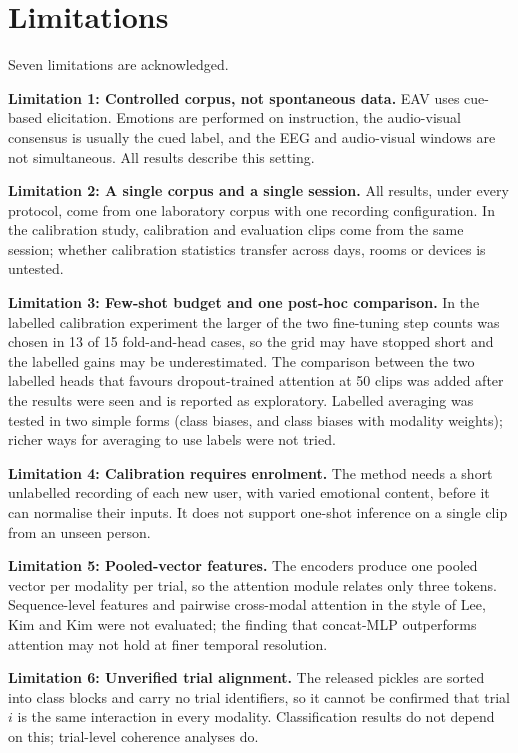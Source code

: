 \section{Limitations}
Seven limitations are acknowledged.

\textbf{Limitation 1: Controlled corpus, not spontaneous data.} EAV uses cue-based elicitation. Emotions are performed on instruction, the audio-visual consensus is usually the cued label, and the EEG and audio-visual windows are not simultaneous. All results describe this setting.

\textbf{Limitation 2: A single corpus and a single session.} All results, under every protocol, come from one laboratory corpus with one recording configuration. In the calibration study, calibration and evaluation clips come from the same session; whether calibration statistics transfer across days, rooms or devices is untested.

\textbf{Limitation 3: Few-shot budget and one post-hoc comparison.} In the labelled calibration experiment the larger of the two fine-tuning step counts was chosen in 13 of 15 fold-and-head cases, so the grid may have stopped short and the labelled gains may be underestimated. The comparison between the two labelled heads that favours dropout-trained attention at 50 clips was added after the results were seen and is reported as exploratory. Labelled averaging was tested in two simple forms (class biases, and class biases with modality weights); richer ways for averaging to use labels were not tried.

\textbf{Limitation 4: Calibration requires enrolment.} The method needs a short unlabelled recording of each new user, with varied emotional content, before it can normalise their inputs. It does not support one-shot inference on a single clip from an unseen person.

\textbf{Limitation 5: Pooled-vector features.} The encoders produce one pooled vector per modality per trial, so the attention module relates only three tokens. Sequence-level features and pairwise cross-modal attention in the style of Lee, Kim and Kim \cite{Lee2024MERCL} were not evaluated; the finding that concat-MLP outperforms attention may not hold at finer temporal resolution.

\textbf{Limitation 6: Unverified trial alignment.} The released pickles are sorted into class blocks and carry no trial identifiers, so it cannot be confirmed that trial $i$ is the same interaction in every modality. Classification results do not depend on this; trial-level coherence analyses do.


